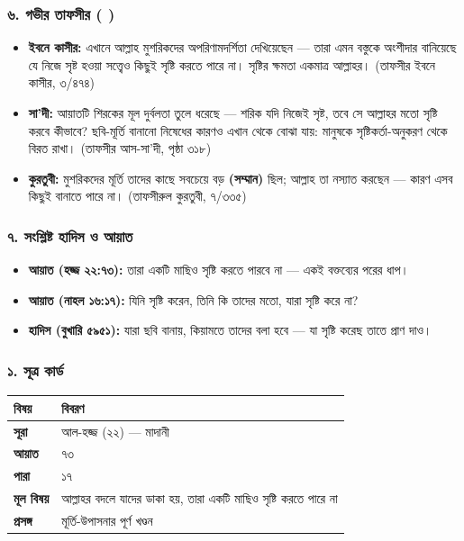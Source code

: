 \subsubsection*{৬. গভীর তাফসীর ( )}

\begin{itemize}
\item \textbf{ইবনে কাসীর:} এখানে আল্লাহ মুশরিকদের অপরিণামদর্শিতা দেখিয়েছেন — তারা এমন বস্তুকে অংশীদার বানিয়েছে যে নিজে সৃষ্ট হওয়া সত্ত্বেও কিছুই সৃষ্টি করতে পারে না। সৃষ্টির ক্ষমতা একমাত্র আল্লাহর। (তাফসীর ইবনে কাসীর, ৩/৪৭৪)
\item \textbf{সা'দী:} আয়াতটি শিরকের মূল দুর্বলতা তুলে ধরেছে — শরিক যদি নিজেই সৃষ্ট, তবে সে আল্লাহর মতো সৃষ্টি করবে কীভাবে? ছবি-মূর্তি বানানো নিষেধের কারণও এখান থেকে বোঝা যায়: মানুষকে সৃষ্টিকর্তা-অনুকরণ থেকে বিরত রাখা। (তাফসীর আস-সা'দী, পৃষ্ঠা ৩১৮)
\item \textbf{কুরতুবী:} মুশরিকদের মূর্তি তাদের কাছে সবচেয়ে বড় \textbf{ (সম্মান)} ছিল; আল্লাহ তা নস্যাত করছেন — কারণ এসব কিছুই বানাতে পারে না। (তাফসীরুল কুরতুবী, ৭/৩৩৫)
\end{itemize}
\subsubsection*{৭. সংশ্লিষ্ট হাদিস ও আয়াত}

\begin{itemize}
\item \textbf{আয়াত (হজ্জ ২২:৭৩):} তারা একটি মাছিও সৃষ্টি করতে পারবে না — একই বক্তব্যের পরের ধাপ।
\item \textbf{আয়াত (নাহল ১৬:১৭):} যিনি সৃষ্টি করেন, তিনি কি তাদের মতো, যারা সৃষ্টি করে না?
\item \textbf{হাদিস (বুখারি ৫৯৫১):} যারা ছবি বানায়, কিয়ামতে তাদের বলা হবে — যা সৃষ্টি করেছ তাতে প্রাণ দাও।
\end{itemize}
\subsubsection*{১. সূত্র কার্ড}

\begin{table}[h]\centering\small
\begin{tabular}{ll}
বিষয় & বিবরণ \\
\hline
\textbf{সূরা} & আল-হজ্জ (২২) — মাদানী \\
\textbf{আয়াত} & ৭৩ \\
\textbf{পারা} & ১৭ \\
\textbf{মূল বিষয়} & আল্লাহর বদলে যাদের ডাকা হয়, তারা একটি মাছিও সৃষ্টি করতে পারে না \\
\textbf{প্রসঙ্গ} & মূর্তি-উপাসনার পূর্ণ খণ্ডন \\
\hline
\end{tabular}
\end{table}

